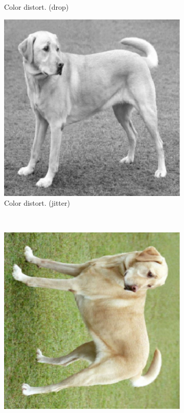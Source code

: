 \begin{figure}[t]
\begin{subfigure}{.19\textwidth}
  \caption{Color distort. (drop)}
\end{subfigure}\begin{subfigure}{.19\textwidth}
  \centering
  \includegraphics[width=0.9\linewidth]{chapters/assets/ssl_figs/transforms/img_color.pdf}
  \caption{Color distort. (jitter)}
\end{subfigure}\\
\begin{subfigure}{.19\textwidth}
  \centering
  \includegraphics[width=0.9\linewidth]{chapters/assets/ssl_figs/transforms/img_rotate.pdf}

\end{subfigure}
\end{figure}
